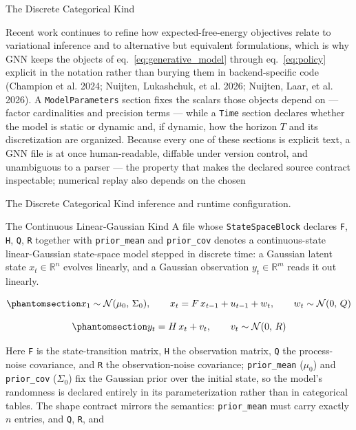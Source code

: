 \documentclass[
  ignorenonframetext,
]{beamer}
\begin{document}
\begin{frame}{The Discrete Categorical Kind}

Recent work continues to refine how expected-free-energy objectives
relate to variational inference and to alternative but equivalent
formulations, which is why GNN keeps the objects of
eq.~\ref{eq:generative_model} through eq.~\ref{eq:policy} explicit in
the notation rather than burying them in backend-specific code (Champion
et al. 2024; Nuijten, Lukashchuk, et al. 2026; Nuijten, Laar, et al.
2026). A \texttt{ModelParameters} section fixes the scalars those
objects depend on --- factor cardinalities and precision terms --- while
a \texttt{Time} section declares whether the model is static or dynamic
and, if dynamic, how the horizon \(T\) and its discretization are
organized. Because every one of these sections is explicit text, a GNN
file is at once human-readable, diffable under version control, and
unambiguous to a parser --- the property that makes the declared source
contract inspectable; numerical replay also depends on the chosen
\end{frame}

\begin{frame}{The Discrete Categorical Kind}
inference and runtime configuration.
\end{frame}

\begin{frame}{The Continuous Linear-Gaussian
Kind}
\protect{}\label{the-continuous-linear-gaussian-kind}
A file whose \texttt{StateSpaceBlock} declares \texttt{F}, \texttt{H},
\texttt{Q}, \texttt{R} together with \texttt{prior\_mean} and
\texttt{prior\_cov} denotes a continuous-state linear-Gaussian
state-space model stepped in discrete time: a Gaussian latent state
\(x_t \in \mathbb{R}^n\) evolves linearly, and a Gaussian observation
\(y_t \in \mathbb{R}^m\) reads it out linearly.

\begin{equation}\protect\phantomsection\label{eq:lgssm_state}{x_1 \sim \mathcal{N}(\mu_0,\, \Sigma_0), \qquad x_t = F\, x_{t-1} + u_{t-1} + w_t, \qquad w_t \sim \mathcal{N}(0,\, Q)}\end{equation}

\begin{equation}\protect\phantomsection\label{eq:lgssm_obs}{y_t = H\, x_t + v_t, \qquad v_t \sim \mathcal{N}(0,\, R)}\end{equation}

Here \texttt{F} is the state-transition matrix, \texttt{H} the
observation matrix, \texttt{Q} the process-noise covariance, and
\texttt{R} the observation-noise covariance; \texttt{prior\_mean}
(\(\mu_0\)) and \texttt{prior\_cov} (\(\Sigma_0\)) fix the Gaussian
prior over the initial state, so the model's randomness is declared
entirely in its parameterization rather than in categorical tables. The
shape contract mirrors the semantics: \texttt{prior\_mean} must carry
exactly \(n\) entries, and \texttt{Q}, \texttt{R}, and
\end{frame}
\end{document}
